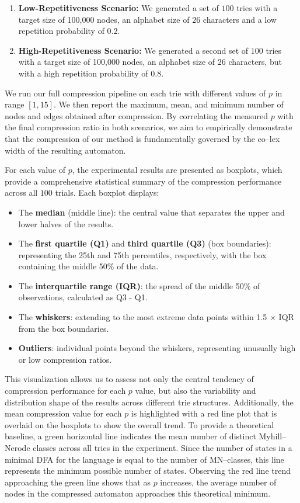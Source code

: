 \begin{enumerate}
    \item \textbf{Low-Repetitiveness Scenario:} We generated a set of $100$ tries with a target size of 100,000 nodes, an alphabet size of $26$ characters and a low repetition probability of $0.2$.
    \item \textbf{High-Repetitiveness Scenario:} We generated a second set of $100$ tries with a target size of 100,000 nodes, an alphabet size of $26$ characters, but with a high repetition probability of $0.8$.
\end{enumerate}

We run our full compression pipeline on each trie with different values of $p$ in range $[1, 15]$. We then report the maximum, mean, and minimum number of nodes and edges obtained after compression. By correlating the measured $p$ with the final compression ratio in both scenarios, we aim to empirically demonstrate that the compression of our method is fundamentally governed by the co--lex width of the resulting automaton.

For each value of $p$, the experimental results are presented as boxplots, which provide a comprehensive statistical summary of the compression performance across all $100$ trials. Each boxplot displays:
\begin{itemize}
    \item The \textbf{median} (middle line): the central value that separates the upper and lower halves of the results.
    \item The \textbf{first quartile (Q1)} and \textbf{third quartile (Q3)} (box boundaries): representing the 25th and 75th percentiles, respectively, with the box containing the middle 50\% of the data.
    \item The \textbf{interquartile range (IQR)}: the spread of the middle 50\% of observations, calculated as Q3 - Q1.
    \item The \textbf{whiskers}: extending to the most extreme data points within 1.5 × IQR from the box boundaries.
    \item \textbf{Outliers}: individual points beyond the whiskers, representing unusually high or low compression ratios.
\end{itemize}
This visualization allows us to assess not only the central tendency of compression performance for each $p$ value, but also the variability and distribution shape of the results across different trie structures. Additionally, the mean compression value for each $p$ is highlighted with a red line plot that is overlaid on the boxplots to show the overall trend. To provide a theoretical baseline, a green horizontal line indicates the mean number of distinct Myhill--Nerode classes across all tries in the experiment. Since the number of states in a minimal DFA for the language is equal to the number of MN--classes, this line represents the minimum possible number of states. Observing the red line trend approaching the green line shows that as $p$ increases, the average number of nodes in the compressed automaton approaches this theoretical minimum.


